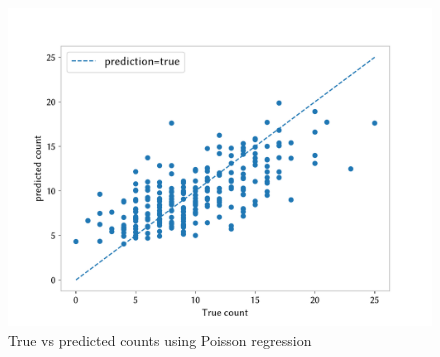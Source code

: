 \begin{answer}
\begin{figure}[h]
    \centering
    \includegraphics*[width=.7\linewidth]{../src/poisson/poisson.pdf}
    \caption{True vs predicted counts using Poisson regression}        
\end{figure}

\end{answer}
